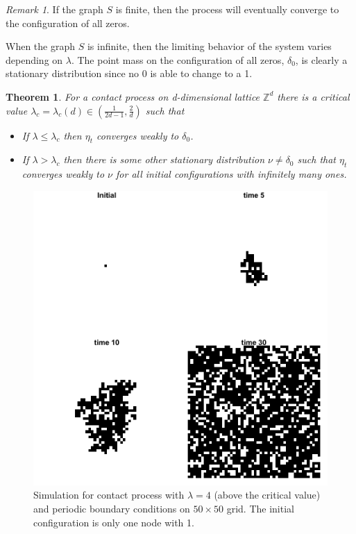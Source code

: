 \documentclass{article}
\theoremstyle{plain}
\newtheorem{theorem}{Theorem}[section]
\theoremstyle{definition}
\theoremstyle{remark}
\newtheorem*{remark}{Remark}
\numberwithin{equation}{section}
\newcommand{\Z}{\mathbb{Z}}
\begin{document}
\begin{remark}
If the graph $S$ is finite, then the process will eventually converge to the configuration of all zeros.
\end{remark}

When the graph $S$ is infinite, then the limiting behavior of the system varies depending on $\lambda$.
The point mass on the configuration of all zeros, $\delta_0$, is clearly a stationary distribution since no 0 is able to change to a 1.

\begin{theorem} \cite{Liggett2002}
For a contact process on d-dimensional lattice $\Z^d$ there is a critical value $\lambda_c = \lambda_c(d) \in \left( \frac{1}{2d - 1}, \frac{2}{d} \right)$ such that
\begin{itemize}
    \item If $\lambda \leq \lambda_c$ then $\eta_t$ converges weakly to $\delta_0$. %
    \item If $\lambda > \lambda_c$ then there is some other stationary distribution $\nu \not = \delta_0$ such that $\eta_t$ converges weakly to $\nu$ for all initial configurations with infinitely many ones.
\end{itemize}
\end{theorem}

\begin{figure}[H]
  \centering
    \includegraphics[width=.80\textwidth]{figures/contact_simulation_torus_25.png}
   \caption{Simulation for contact process with $\lambda = 4$ (above the critical value) and periodic boundary conditions on $50 \times 50$ grid. The initial configuration is only one node with 1.}
  \label{fig:contact_sim_torus_above_crit.png}
\end{figure}
\end{document}
